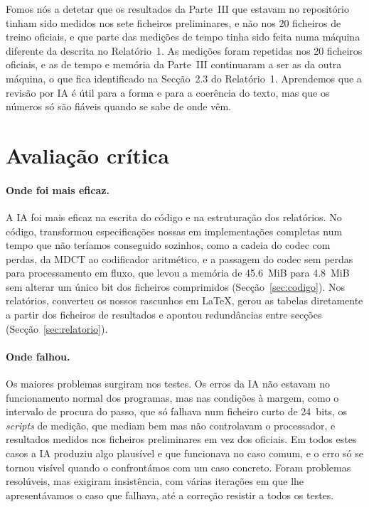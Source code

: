 \documentclass[a4paper,11pt]{article}
\begin{document}
Fomos nós a detetar que os resultados da Parte~III que estavam no repositório
tinham sido medidos nos sete ficheiros preliminares, e não nos 20 ficheiros de
treino oficiais, e que parte das medições de tempo tinha sido feita numa máquina
diferente da descrita no Relatório~1. As medições foram repetidas nos 20
ficheiros oficiais, e as de tempo e memória da Parte~III continuaram a ser as da
outra máquina, o que fica identificado na Secção~2.3 do Relatório~1. Aprendemos
que a revisão por IA é útil para a forma e para a coerência do texto, mas que os
números só são fiáveis quando se sabe de onde vêm.

\section{Avaliação crítica}
\label{sec:critica}

\paragraph{Onde foi mais eficaz.}
A IA foi mais eficaz na escrita do código e na estruturação dos relatórios. No
código, transformou especificações nossas em implementações completas num tempo
que não teríamos conseguido sozinhos, como a cadeia do codec com perdas, da MDCT
ao codificador aritmético, e a passagem do codec sem perdas para processamento
em fluxo, que levou a memória de \SI{45,6}{MiB} para \SI{4,8}{MiB} sem alterar
um único bit dos ficheiros comprimidos (Secção~\ref{sec:codigo}). Nos
relatórios, converteu os nossos rascunhos em \LaTeX{}, gerou as tabelas
diretamente a partir dos ficheiros de resultados e apontou redundâncias entre
secções (Secção~\ref{sec:relatorio}).

\paragraph{Onde falhou.}
Os maiores problemas surgiram nos testes. Os erros da IA não estavam no
funcionamento normal dos programas, mas nas condições à margem, como o intervalo
de procura do passo, que só falhava num ficheiro curto de 24~bits, os
\emph{scripts} de medição, que mediam bem mas não controlavam o processador, e
resultados medidos nos ficheiros preliminares em vez dos oficiais. Em todos
estes casos a IA produziu algo plausível e que funcionava no caso comum, e o
erro só se tornou visível quando o confrontámos com um caso concreto. Foram
problemas resolúveis, mas exigiram insistência, com várias iterações em que lhe
apresentávamos o caso que falhava, até a correção resistir a todos os testes.
\end{document}
